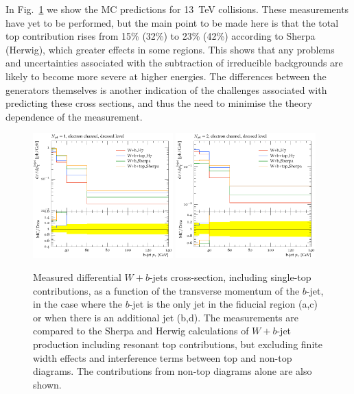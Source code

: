 \documentclass[11pt]{cernrep}
\begin{document}
In Fig.~\ref{fig:13tev} we show the MC predictions for 13~TeV collisions. These measurements have yet to be
performed, but the main point to be made here is that the total top contribution rises from 15\% (32\%)
to 23\% (42\%) according to Sherpa (Herwig), which greater effects in some regions.  This shows that any
problems and uncertainties associated with the subtraction of irreducible backgrounds are likely to become
more severe at higher energies. The differences between the generators themselves is another indication of the 
challenges associated with predicting these cross sections, and thus the need to minimise the theory
dependence of the measurement.
  
\begin{figure}
\centering
	\includegraphics[width=0.48\textwidth]{13tev-1jet.pdf}
	\includegraphics[width=0.48\textwidth]{13tev-2jet.pdf}
\caption{\label{fig:13tev}
  Measured differential $W+b$-jets cross-section, including single-top contributions, as a function of the
  transverse momentum of the $b$-jet, in the case where the $b$-jet is the only jet in the fiducial region
  (a,c) or when there is an additional jet (b,d).  The measurements are compared to the Sherpa and Herwig
  calculations of $W+b$-jet production including resonant top contributions, but excluding finite width effects 
  and interference terms between top and non-top diagrams. The contributions from non-top diagrams alone are
  also shown.}
\end{figure}
\end{document}
